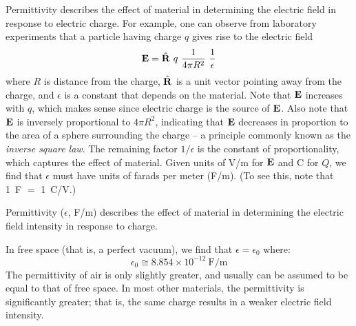 

\label{m0008_Permittivity} %

Permittivity describes the effect of material in determining the electric field in response to electric charge.  For example, one can observe from laboratory experiments %
that a particle having charge $q$ gives rise to the electric field 
%
\begin{equation}
{\bf E} = \hat{\bf R} ~ q ~ \frac{1}{4\pi R^2} ~ \frac{1}{\epsilon}
\end{equation}
%
where $R$ is distance from the charge, 
$\hat{\bf R}$ is a unit vector pointing away from the charge,
and $\epsilon$ is a constant that depends on the material.
Note that ${\bf E}$ increases with $q$, which makes sense since electric charge is the source of ${\bf E}$.  
Also note that ${\bf E}$ is inversely proportional to $4\pi R^2$, indicating that ${\bf E}$ decreases in proportion to the area of a sphere surrounding the charge -- a principle commonly known as the \emph{inverse square law}.
The remaining factor $1/\epsilon$ is the constant of proportionality, which captures the effect of material.   
Given units of V/m for ${\bf E}$ and C for $Q$, we find that $\epsilon$ must have units of farads per meter (F/m). 
(To see this, note that 1~F $=$ 1~C/V.)    

\begin{mdframed}[backgroundcolor=yellow!20,nobreak=true] 
Permittivity ($\epsilon$, F/m) describes the effect of material in determining the electric field intensity in response to charge. 
\end{mdframed}

In free space (that is, a perfect vacuum), we find that $\epsilon = \epsilon_0$ where:
%
\begin{equation}
\epsilon_0 \cong 8.854 \times 10^{-12} ~\mbox{F/m}
\end{equation}
% 
The permittivity of air is only slightly greater, and usually can be assumed to be equal to that of free space.
In most other materials, the permittivity is significantly greater; that is, the same charge results in a weaker electric field intensity.  

